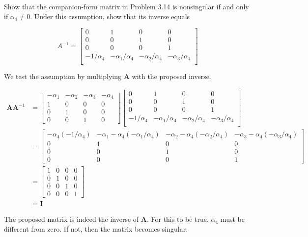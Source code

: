 \item [3.16] Show that the companion-form matrix in Problem 3.14 is nonsingular if and only if $\alpha_4 \neq 0$.
Under this assumption, show that its inverse equals

\begin{equation*}
 A^{-1} = \begin{bmatrix}
           0 & 1 & 0 & 0 \\
           0 & 0 & 1 & 0 \\
           0 & 0 & 0 & 1 \\
           -1/\alpha_4 & -\alpha_1/\alpha_4 & -\alpha_2 /\alpha_4 & -\alpha_3 /\alpha_4 \\
          \end{bmatrix}
\end{equation*}


We test the assumption by multiplying $\mathbf{A}$ with the proposed inverse.

\begin{align*}
 \mathbf{A}\mathbf{A}^{-1} &=
        \begin{bmatrix}
      -\alpha_1 & -\alpha_2 & -\alpha_3 & -\alpha_4\\
      1 & 0 & 0 & 0\\
      0 & 1 & 0 & 0\\
      0 & 0 & 1 & 0
     \end{bmatrix}
        \begin{bmatrix}
           0 & 1 & 0 & 0 \\
           0 & 0 & 1 & 0 \\
           0 & 0 & 0 & 1 \\
           -1/\alpha_4 & -\alpha_1/\alpha_4 & -\alpha_2 /\alpha_4 & -\alpha_3 /\alpha_4 \\
          \end{bmatrix}\\
    &= \begin{bmatrix}
        -\alpha_4(-1/\alpha_4) &
        -\alpha_1 -\alpha_4(-\alpha_1/\alpha_4) &
        -\alpha_2 -\alpha_4(-\alpha_2/\alpha_4) &
        -\alpha_3 -\alpha_4(-\alpha_3/\alpha_4) \\
        0 & 1 & 0 & 0\\
        0 & 0 & 1 & 0\\
        0 & 0 & 0 & 1
       \end{bmatrix}\\
    &= \begin{bmatrix}
        1 & 0 & 0 & 0\\
        0 & 1 & 0 & 0\\
        0 & 0 & 1 & 0\\
        0 & 0 & 0 & 1
       \end{bmatrix}\\
       &= \mathbf{I}
\end{align*}

The proposed matrix is indeed the inverse of $\mathbf{A}$.
For this to be true, $\alpha_4$  must be different from zero.
If not, then the matrix becomes singular.
